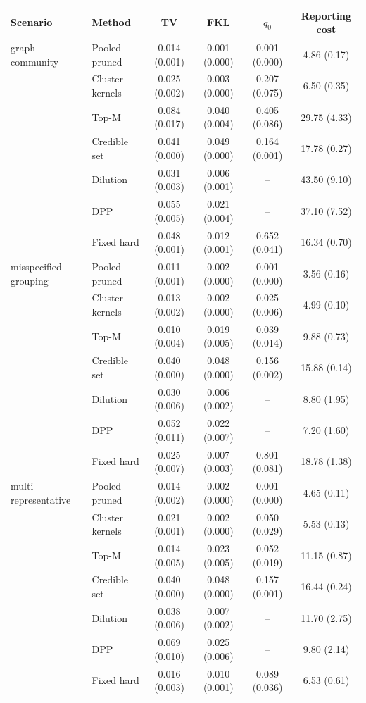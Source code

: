 \begin{tabular}{llcccc}
\toprule
Scenario & Method & TV & FKL & $q_0$ & Reporting cost \\
\midrule
graph community & Pooled-pruned & 0.014 (0.001) & 0.001 (0.000) & 0.001 (0.000) & 4.86 (0.17) \\
 & Cluster kernels & 0.025 (0.002) & 0.003 (0.000) & 0.207 (0.075) & 6.50 (0.35) \\
 & Top-M & 0.084 (0.017) & 0.040 (0.004) & 0.405 (0.086) & 29.75 (4.33) \\
 & Credible set & 0.041 (0.000) & 0.049 (0.000) & 0.164 (0.001) & 17.78 (0.27) \\
 & Dilution & 0.031 (0.003) & 0.006 (0.001) & -- & 43.50 (9.10) \\
 & DPP & 0.055 (0.005) & 0.021 (0.004) & -- & 37.10 (7.52) \\
 & Fixed hard & 0.048 (0.001) & 0.012 (0.001) & 0.652 (0.041) & 16.34 (0.70) \\
\addlinespace
misspecified grouping & Pooled-pruned & 0.011 (0.001) & 0.002 (0.000) & 0.001 (0.000) & 3.56 (0.16) \\
 & Cluster kernels & 0.013 (0.002) & 0.002 (0.000) & 0.025 (0.006) & 4.99 (0.10) \\
 & Top-M & 0.010 (0.004) & 0.019 (0.005) & 0.039 (0.014) & 9.88 (0.73) \\
 & Credible set & 0.040 (0.000) & 0.048 (0.000) & 0.156 (0.002) & 15.88 (0.14) \\
 & Dilution & 0.030 (0.006) & 0.006 (0.002) & -- & 8.80 (1.95) \\
 & DPP & 0.052 (0.011) & 0.022 (0.007) & -- & 7.20 (1.60) \\
 & Fixed hard & 0.025 (0.007) & 0.007 (0.003) & 0.801 (0.081) & 18.78 (1.38) \\
\addlinespace
multi representative & Pooled-pruned & 0.014 (0.002) & 0.002 (0.000) & 0.001 (0.000) & 4.65 (0.11) \\
 & Cluster kernels & 0.021 (0.001) & 0.002 (0.000) & 0.050 (0.029) & 5.53 (0.13) \\
 & Top-M & 0.014 (0.005) & 0.023 (0.005) & 0.052 (0.019) & 11.15 (0.87) \\
 & Credible set & 0.040 (0.000) & 0.048 (0.000) & 0.157 (0.001) & 16.44 (0.24) \\
 & Dilution & 0.038 (0.006) & 0.007 (0.002) & -- & 11.70 (2.75) \\
 & DPP & 0.069 (0.010) & 0.025 (0.006) & -- & 9.80 (2.14) \\
 & Fixed hard & 0.016 (0.003) & 0.010 (0.001) & 0.089 (0.036) & 6.53 (0.61) \\

\end{tabular}

